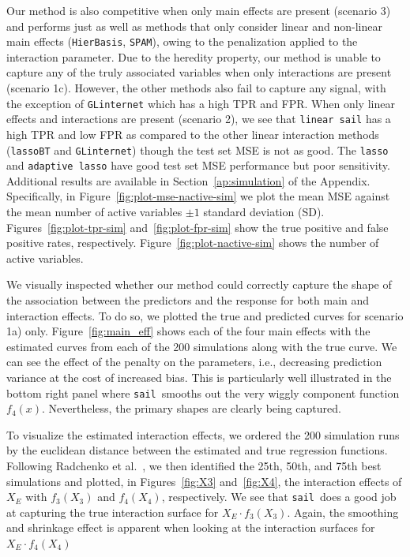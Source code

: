 \documentclass[12pt,letter]{article}\usepackage[]{graphicx}\usepackage[]{color}
\newcommand{\sail}{\texttt{sail}}
\begin{document}
Our method is also competitive when only main effects are present (scenario 3) and performs just as well as methods that only consider linear and non-linear main effects (\texttt{HierBasis}, \texttt{SPAM}), owing to the penalization applied to the interaction parameter. Due to the heredity property, our method is unable to capture any of the truly associated variables when only interactions are present (scenario 1c). However, the other methods also fail to capture any signal, with the exception of \texttt{GLinternet} which has a high TPR and FPR. When only linear effects and interactions are present (scenario 2), we see that \texttt{linear sail} has a high TPR and low FPR as compared to the other linear interaction methods (\texttt{lassoBT} and \texttt{GLinternet}) though the test set MSE is not as good. The \texttt{lasso} and \texttt{adaptive lasso} have good test set MSE performance but poor sensitivity. Additional results are available in Section~\ref{ap:simulation} of the Appendix. Specifically, in Figure~\ref{fig:plot-mse-nactive-sim} we plot the mean MSE against the mean number of active variables $\pm 1$ standard deviation (SD). Figures~\ref{fig:plot-tpr-sim} and~\ref{fig:plot-fpr-sim} show the true positive and false positive rates, respectively. Figure~\ref{fig:plot-nactive-sim} shows the number of active variables.

We visually inspected whether our method could correctly capture the shape of the association between the predictors and the response for both main and interaction effects. To do so, we plotted the true and predicted curves for scenario 1a) only. Figure~\ref{fig:main_eff} shows each of the four main effects with the estimated curves from each of the 200 simulations along with the true curve. We can see the effect of the penalty on the parameters, i.e., decreasing prediction variance at the cost of increased bias. This is particularly well illustrated in the bottom right panel where \sail ~smooths out the very wiggly component function $f_4(x)$. Nevertheless, the primary shapes are clearly being captured.

To visualize the estimated interaction effects, we ordered the 200 simulation runs by the euclidean distance between the estimated and true regression functions. Following Radchenko et al.~\citep{radchenko2010variable}, we then identified the 25th, 50th, and 75th best simulations and plotted, in Figures~\ref{fig:X3} and~\ref{fig:X4}, the interaction effects of $X_E$ with $f_3(X_3)$ and $f_4(X_4)$, respectively. We see that \sail ~does a good job at capturing the true interaction surface for $X_E \cdot f_3(X_3)$. Again, the smoothing and shrinkage effect is apparent when looking at the interaction surfaces for $X_E \cdot f_4(X_4)$
\end{document}
